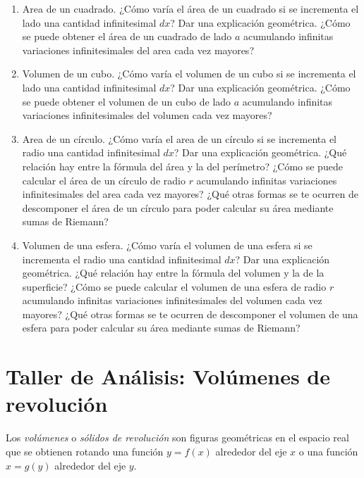 \documentclass[
  a4paper,
]{scrreport}
\begin{document}
\begin{enumerate}
\def\labelenumi{\arabic{enumi}.}
\item
  Area de un cuadrado. ¿Cómo varía el área de un cuadrado si se
  incrementa el lado una cantidad infinitesimal \(dx\)? Dar una
  explicación geométrica. ¿Cómo se puede obtener el área de un cuadrado
  de lado \(a\) acumulando infinitas variaciones infinitesimales del
  area cada vez mayores?
\item
  Volumen de un cubo. ¿Cómo varía el volumen de un cubo si se incrementa
  el lado una cantidad infinitesimal \(dx\)? Dar una explicación
  geométrica. ¿Cómo se puede obtener el volumen de un cubo de lado \(a\)
  acumulando infinitas variaciones infinitesimales del volumen cada vez
  mayores?
\item
  Area de un círculo. ¿Cómo varía el area de un círculo si se incrementa
  el radio una cantidad infinitesimal \(dx\)? Dar una explicación
  geométrica. ¿Qué relación hay entre la fórmula del área y la del
  perímetro? ¿Cómo se puede calcular el área de un círculo de radio
  \(r\) acumulando infinitas variaciones infinitesimales del area cada
  vez mayores? ¿Qué otras formas se te ocurren de descomponer el área de
  un círculo para poder calcular su área mediante sumas de Riemann?
\item
  Volumen de una esfera. ¿Cómo varía el volumen de una esfera si se
  incrementa el radio una cantidad infinitesimal \(dx\)? Dar una
  explicación geométrica. ¿Qué relación hay entre la fórmula del volumen
  y la de la superficie? ¿Cómo se puede calcular el volumen de una
  esfera de radio \(r\) acumulando infinitas variaciones infinitesimales
  del volumen cada vez mayores? ¿Qué otras formas se te ocurren de
  descomponer el volumen de una esfera para poder calcular su área
  mediante sumas de Riemann?
\end{enumerate}


\hypertarget{taller-de-anuxe1lisis-voluxfamenes-de-revoluciuxf3n}{%
\chapter{Taller de Análisis: Volúmenes de
revolución}\label{taller-de-anuxe1lisis-voluxfamenes-de-revoluciuxf3n}}

Los \emph{volúmenes} o \emph{sólidos de revolución} son figuras
geométricas en el espacio real que se obtienen rotando una función
\(y=f(x)\) alrededor del eje \(x\) o una función \(x=g(y)\) alrededor
del eje \(y\).
\end{document}

